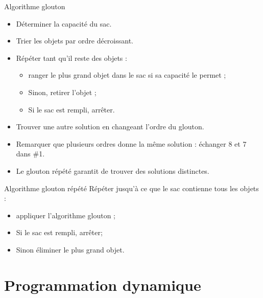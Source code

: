 \documentclass[11pt,a4paper]{article}
\begin{document}
  \begin{algorithme}{Algorithme glouton}
    \label{algo:gs}
    \begin{itemize}
    \item Déterminer la capacité du sac.
    \item Trier les objets par ordre décroissant.
    \item  Répéter tant qu'il reste des objets :
      \begin{itemize}
      \item ranger le plus grand objet dans le sac si sa capacité le permet ;
      \item Sinon, retirer l'objet ;
      \item Si le sac est rempli, arrêter.
      \end{itemize}
  \end{itemize}
  \end{algorithme}

  
  

  \begin{remarque}

    \begin{itemize}
    \item Trouver une autre solution en changeant l'ordre du glouton.
    \item Remarquer que plusieurs ordres donne la même solution : échanger 8 et 7 dans \#1.
    \item Le glouton répété garantit de trouver des solutions distinctes.
    \end{itemize}
  \end{remarque}

  \begin{algorithme}{Algorithme glouton répété}
     \label{algo:mtgs}
    Répéter jusqu'à ce que le sac contienne tous les objets :
    \begin{itemize}
    \item appliquer l'algorithme glouton ;
    \item Si le sac est rempli, arrêter;
    \item Sinon éliminer le plus grand objet.
    \end{itemize}
  \end{algorithme}

  
  


  \section{Programmation dynamique}
\end{document}
